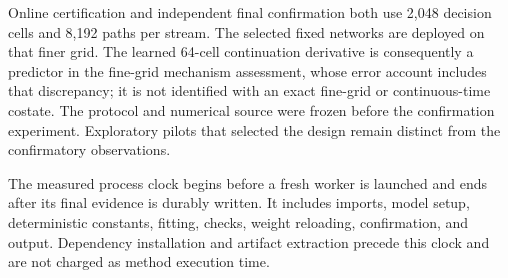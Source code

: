 Online certification and independent final confirmation both use 2,048
decision cells and 8,192 paths per stream. The selected fixed networks
are deployed on that finer grid. The learned 64-cell continuation
derivative is consequently a predictor in the fine-grid mechanism
assessment, whose error account includes that discrepancy; it is not
identified with an exact fine-grid or continuous-time costate.
The protocol and numerical source were frozen before the confirmation
experiment. Exploratory pilots that selected the design remain distinct
from the confirmatory observations.

The measured process clock begins before a fresh worker is launched and
ends after its final evidence is durably written. It includes imports,
model setup, deterministic constants, fitting, checks, weight reloading,
confirmation, and output. Dependency installation and artifact extraction
precede this clock and are not charged as method execution time.
